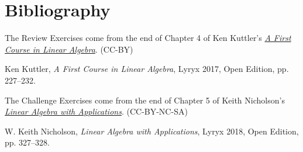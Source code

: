 \documentclass{ximera}
\begin{document}
\section*{Bibliography}
The Review Exercises come from the end of Chapter 4 of Ken Kuttler's \href{https://open.umn.edu/opentextbooks/textbooks/a-first-course-in-linear-algebra-2017}{\it A First Course in Linear Algebra}. (CC-BY)

Ken Kuttler, {\it  A First Course in Linear Algebra}, Lyryx 2017, Open Edition, pp. 227--232.  

The Challenge Exercises come from the end of Chapter 5 of Keith Nicholson's \href{https://open.umn.edu/opentextbooks/textbooks/linear-algebra-with-applications}{\it Linear Algebra with Applications}. (CC-BY-NC-SA)

W. Keith Nicholson, {\it Linear Algebra with Applications}, Lyryx 2018, Open Edition, pp. 327--328. 
\end{document}
